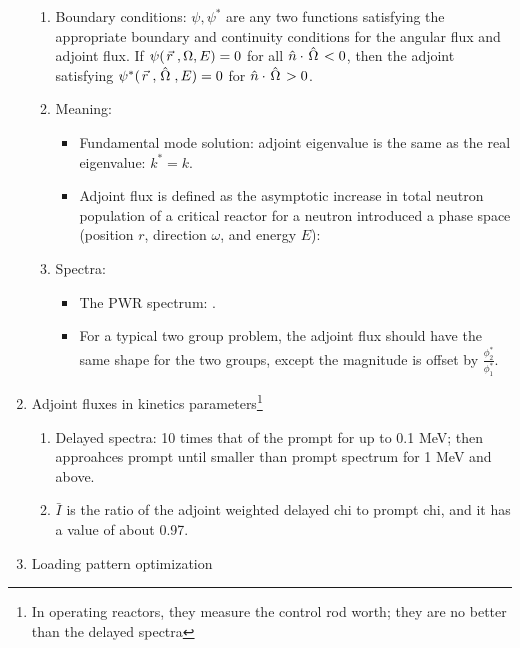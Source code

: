 \documentclass{school-22.211-notes}
\begin{document}
\begin{enumerate}
\begin{enumerate}
  \item Boundary conditions: $\psi, \psi^*$ are any two functions satisfying the appropriate boundary and continuity conditions for the angular flux and adjoint flux. If $\psi(\left.\vec{r}\right., \Omega, E) = 0$ for all $\hat{n} \cdot \left. \hat{\Omega} \right. < 0$, then the adjoint satisfying $\psi^*(\left.\vec{r}\right., \left. \hat{\Omega} \right., E) = 0$ for $\hat{n} \cdot \left. \hat{\Omega} \right. > 0$. 


  \item Meaning:
    \begin{itemize}
    \item Fundamental mode solution: adjoint eigenvalue is the same as the real eigenvalue: $k^* = k$. 
    \item Adjoint flux is defined as the asymptotic increase in total neutron population of a critical reactor for a neutron introduced a phase space (position $r$, direction $\omega$, and energy $E$): 
    \end{itemize}

  \item Spectra: 
    \begin{itemize}
    \item The PWR spectrum: . 
    \item For a typical two group problem, the adjoint flux should have the same shape for the two groups, except the magnitude is offset by $\frac{\phi_2^*}{\phi_1^*}$. 
    \end{itemize}
  \end{enumerate} 

\item Adjoint fluxes in kinetics parameters\footnote{In operating reactors, they measure the control rod worth; they are no better than the delayed spectra}
  \begin{enumerate}
  \item Delayed spectra: 10 times that of the prompt for up to 0.1 MeV; then approahces prompt until smaller than prompt spectrum for 1 MeV and above. 

  \item $\bar{I}$ is the ratio of the adjoint weighted delayed chi to prompt chi, and it has a value of about 0.97.
  \end{enumerate}

\item Loading pattern optimization
\end{enumerate}
\end{document}
